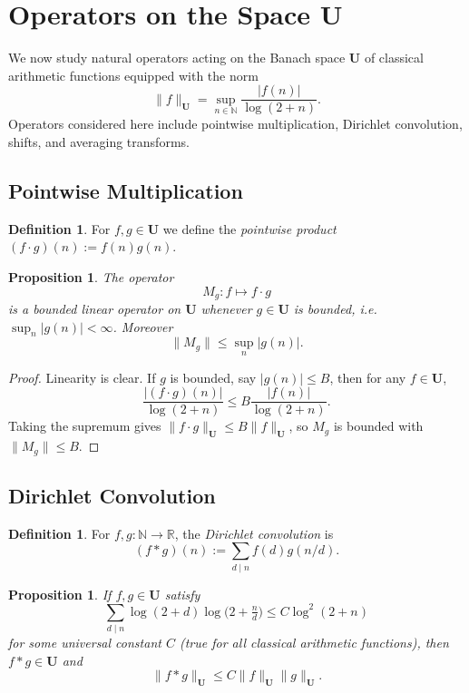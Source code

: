 \documentclass[11pt,a4paper]{article}
\theoremstyle{plain}
\newtheorem{proposition}[theorem]{Proposition}
\theoremstyle{definition}
\newtheorem{definition}[theorem]{Definition}
\theoremstyle{remark}
\begin{document}
\section{Operators on the Space $\mathbf{U}$}

We now study natural operators acting on the Banach space
$\mathbf{U}$ of classical arithmetic functions
equipped with the norm
\[
\|f\|_{\mathbf{U}} = \sup_{n\in\mathbb{N}}
\frac{|f(n)|}{\log(2+n)}.
\]
Operators considered here include
pointwise multiplication,
Dirichlet convolution,
shifts, and averaging transforms.

\subsection{Pointwise Multiplication}
\begin{definition}
	For $f,g\in \mathbf{U}$ we define
	the \emph{pointwise product}
	$(f\cdot g)(n) := f(n)g(n)$.
\end{definition}

\begin{proposition}
	The operator
	\[
	M_g : f \mapsto f\cdot g
	\]
	is a bounded linear operator on $\mathbf{U}$ whenever
	$g\in \mathbf{U}$ is bounded, i.e.
	$\sup_{n}|g(n)|<\infty$.
	Moreover
	\[
	\|M_g\| \le
	\sup_{n}|g(n)|.
	\]
\end{proposition}

\begin{proof}
	Linearity is clear.
	If $g$ is bounded, say $|g(n)|\le B$,
	then for any $f\in\mathbf{U}$,
	\[
	\frac{|(f\cdot g)(n)|}{\log(2+n)}
	\le B\frac{|f(n)|}{\log(2+n)}.
	\]
	Taking the supremum gives
	$\|f\cdot g\|_{\mathbf{U}}\le B\|f\|_{\mathbf{U}}$,
	so $M_g$ is bounded with $\|M_g\|\le B$.
\end{proof}

\subsection{Dirichlet Convolution}
\begin{definition}
	For $f,g:\mathbb{N}\to\mathbb{R}$,
	the \emph{Dirichlet convolution} is
	\[
	(f*g)(n) := \sum_{d\mid n} f(d) g(n/d).
	\]
\end{definition}

\begin{proposition}
	If $f,g\in \mathbf{U}$ satisfy
	\[
	\sum_{d\mid n} \log(2+d) \log\bigl(2+\tfrac{n}{d}\bigr)
	\le C \log^2(2+n)
	\]
	for some universal constant $C$ (true for all classical
	arithmetic functions), then
	$f*g \in \mathbf{U}$ and
	\[
	\|f*g\|_{\mathbf{U}}
	\le C \|f\|_{\mathbf{U}}\|g\|_{\mathbf{U}}.
	\]
\end{proposition}
\end{document}
